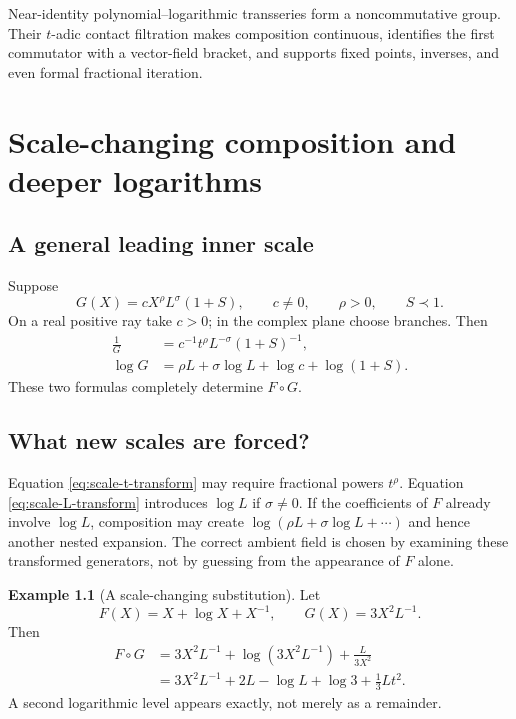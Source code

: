 \documentclass[11pt,oneside]{book}
\theoremstyle{definition}
\newtheorem{example}[theorem]{Example}
\theoremstyle{remark}
\newcommand{\precdom}{\prec}
\newcommand{\compose}{\mathbin{\circ}}
\begin{document}
\begin{summarybox}
Near-identity polynomial--logarithmic transseries form a noncommutative group.
Their $t$-adic contact filtration makes composition continuous, identifies the
first commutator with a vector-field bracket, and supports fixed points,
inverses, and even formal fractional iteration.
\end{summarybox}


\chapter{Scale-changing composition and deeper logarithms}
\label{ch:composition-scale}

\section{A general leading inner scale}
Suppose
\begin{equation}\label{eq:G-general-leading}
 G(X)=cX^\rho L^\sigma(1+S),
 \qquad c\ne0,
 \qquad \rho>0,
 \qquad S\precdom1.
\end{equation}
On a real positive ray take $c>0$; in the complex plane choose branches.
Then
\begin{align}
 \frac1G&=c^{-1}t^\rho L^{-\sigma}(1+S)^{-1},
 \label{eq:scale-t-transform}\\
 \log G&=\rho L+\sigma\log L+\log c+\log(1+S).
 \label{eq:scale-L-transform}
\end{align}
These two formulas completely determine $F\compose G$.

\section{What new scales are forced?}
Equation \eqref{eq:scale-t-transform} may require fractional powers $t^\rho$.
Equation \eqref{eq:scale-L-transform} introduces $\log L$ if $\sigma\ne0$.
If the coefficients of $F$ already involve $\log L$, composition may create
$\log(\rho L+\sigma\log L+\cdots)$ and hence another nested expansion.  The
correct ambient field is chosen by examining these transformed generators,
not by guessing from the appearance of $F$ alone.

\begin{example}[A scale-changing substitution]
Let
\[
 F(X)=X+\log X+X^{-1},
 \qquad
 G(X)=3X^2L^{-1}.
\]
Then
\begin{align*}
 F\compose G
 &=3X^2L^{-1}
 +\log(3X^2L^{-1})
 +\frac{L}{3X^2}\\
 &=3X^2L^{-1}+2L-\log L+\log3+\frac13Lt^2.
\end{align*}
A second logarithmic level appears exactly, not merely as a remainder.
\end{example}
\end{document}
